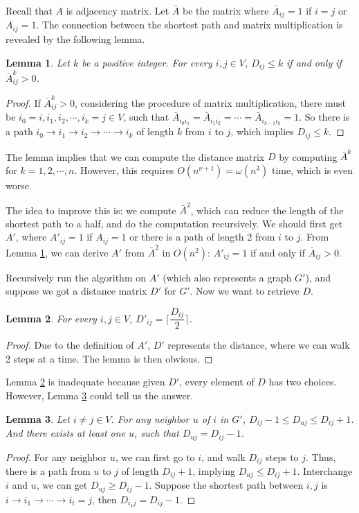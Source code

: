 \documentclass[11pt]{article}
\theoremstyle{plain}
\newtheorem{lemma}{Lemma}[section]
\begin{document}
Recall that $A$ is adjacency matrix. Let $\bar{A}$ be the matrix where $\bar{A}_{ij}=1$ if $i=j$ or $A_{ij}=1$. The connection between the shortest path and matrix multiplication is revealed by the following lemma.
\begin{lemma}
    \label{lemma:shortest_path_matrix_multiplication}
    Let $k$ be a positive integer. For every $i,j\in V$, $D_{ij}\le k$ if and only if $\bar{A}^k_{ij}>0$.
\end{lemma}
\begin{proof}
If $\bar{A}^k_{ij}>0$, considering the procedure of matrix multiplication, there must be $i_0=i,i_1,i_2,\cdots,i_k=j\in V$, such that $\bar A_{i_0i_1}=\bar A_{i_1i_2}=\cdots=\bar A_{i_{k-1}i_k}=1$. So there is a path $i_0\to i_1\to i_2\to\cdots\to i_k$ of length $k$ from $i$ to $j$, which implies $D_{ij}\le k$.
\end{proof}

The lemma implies that we can compute the distance matrix $D$ by computing $\bar{A}^k$ for $k=1,2,\cdots,n$. However, this requires $O(n^{\nu+1})=\omega(n^3)$ time, which is even worse.

The idea to improve this is: we compute $\bar A^2$, which can reduce the length of the shortest path to a half, and do the computation recursively. We should first get $A'$, where $A'_{ij}=1$ if $A_{ij}=1$ or there is a path of length 2 from $i$ to $j$. From Lemma \ref{lemma:shortest_path_matrix_multiplication}, we can derive $A'$ from $\bar A^2$ in $O(n^2)$: $A'_{ij}=1$ if and only if $\bar A_{ij}>0$.

Recursively run the algorithm on $A'$ (which also represents a graph $G'$), and suppose we got a distance matrix $D'$ for $G'$. Now we want to retrieve $D$.

\begin{lemma}
\label{2}
For every $i,j\in V$, $D'_{ij}=\lceil\dfrac{D_{ij}}{2}\rceil$.
\end{lemma}
\begin{proof}
Due to the definition of $A'$, $D'$ represents the distance, where we can walk 2 steps at a time. The lemma is then obvious.
\end{proof}

Lemma \ref{2} is inadequate because given $D'$, every element of $D$ has two choices. However, Lemma \ref{3} could tell us the answer.
\begin{lemma}
\label{3}
Let $i\not=j \in V$. For any neighbor $u$ of $i$ in $G'$, $D_{ij}-1\le D_{uj}\le D_{ij}+1$. And there exists at least one $u$, such that $D_{uj}=D_{ij}-1$.
\end{lemma}
\begin{proof}
For any neighbor $u$, we can first go to $i$, and walk $D_{ij}$ steps to $j$. Thus, there is a path from $u$ to $j$ of length $D_{ij}+1$, implying $D_{uj}\le D_{ij}+1$. Interchange $i$ and $u$, we can get $D_{uj}\ge D_{ij}-1$. Suppose the shortest path between $i,j$ is $i\to i_1\to\cdots\to i_t=j$, then $D_{i_1j}=D_{ij}-1$.
\end{proof}
\end{document}
